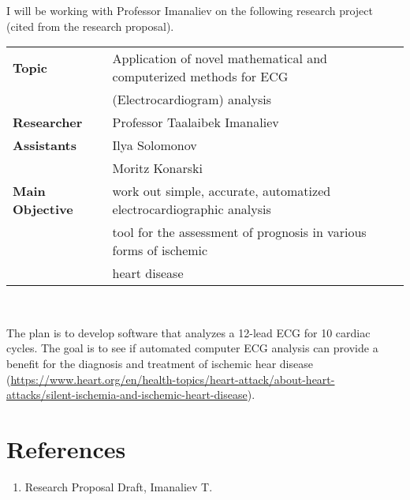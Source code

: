 \documentclass[a4paper, 12pt, reqno]{article}
\title{\titl}
\author{\auth}
\date{\today}
\numberwithin{equation}{section}
\begin{document}
\maketitle

I will be working with Professor Imanaliev on the following research project
(cited from the research proposal).

\begin{center}
\begin{tabular}{| l | l |}\hline
    \textbf{Topic} & Application of novel mathematical and computerized methods 
    for ECG \\
    & (Electrocardiogram) analysis
    \\\hline
    \textbf{Researcher} & Professor Taalaibek Imanaliev \\\hline
    \textbf{Assistants} & Ilya Solomonov\\
    &Moritz Konarski \\\hline
    \textbf{Main Objective} & work out simple, accurate, automatized 
    electrocardiographic analysis\\
    & tool for the assessment of prognosis in various forms of ischemic\\
    & heart disease     \\\hline
\end{tabular}\\
\end{center}

The plan is to develop software that analyzes a 12-lead ECG for 10 cardiac
cycles. The goal is to see if automated computer ECG analysis can provide
a benefit for the diagnosis and treatment of ischemic hear disease
(\url{https://www.heart.org/en/health-topics/heart-attack/about-heart-attacks/silent-ischemia-and-ischemic-heart-disease}).

\section*{References}

\begin{enumerate}
    \item Research Proposal Draft, Imanaliev T.
\end{enumerate}
\end{document}
